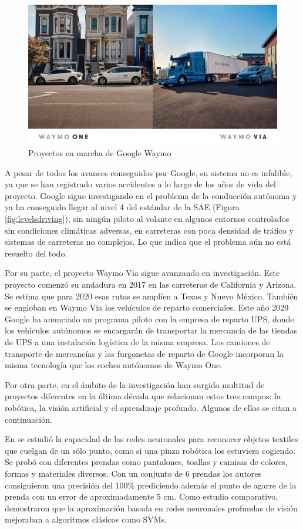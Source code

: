 \begin{figure}
  \centering
  \includegraphics[width=.9\linewidth]{img/waymo_one_via.jpg}
  \caption{Proyectos en marcha de Google Waymo}
  \label{fig:waymo}
\end{figure}

A pesar de todos los avances conseguidos por Google, su sistema no es infalible, ya que se han registrado varios accidentes a lo largo de los años de vida del proyecto. Google sigue investigando en el problema de la conducción autónoma y ya ha conseguido llegar al nivel 4 del estándar de la SAE (Figura \ref{fig:levelsdriving}), sin ningún piloto al volante en algunos entornos controlados sin condiciones climáticas adversas, en carreteras con poca densidad de tráfico y sistemas de carreteras no complejos. Lo que indica que el problema aún no está resuelto del todo.

Por su parte, el proyecto Waymo Via sigue avanzando en investigación. Este proyecto comenzó su andadura en 2017 en las carreteras de California y Arizona.  Se estima que para 2020 esas rutas se amplíen a Texas y Nuevo México. También se engloban en Waymo Via los vehículos de reparto comerciales. Este año 2020 Google ha anunciado un programa piloto con la empresa de reparto UPS, donde los vehículos autónomos se encargarán de transportar la mercancía de las tiendas de UPS a una instalación logística de la misma empresa. Los camiones de transporte de mercancías y las furgonetas de reparto de Google incorporan la misma tecnología que los coches autónomos de Waymo One.

Por otra parte, en el ámbito de la investigación han surgido multitud de proyectos diferentes en la última década que relacionan estos tres campos: la robótica, la visión artificial y el aprendizaje profundo. Algunos de ellos se citan a continuación.

En \cite{deformable} se estudió la capacidad de las redes neuronales para reconocer objetos textiles que cuelgan de un sólo punto, como si una pinza robótica los estuviera cogiendo. Se probó con diferentes prendas como pantalones, toallas y camisas de colores, formas y materiales diversos. Con un conjunto de 6 prendas los autores consiguieron una precisión del 100\% prediciendo además el punto de agarre de la prenda con un error de aproximadamente 5 cm. Como estudio comparativo, demostraron que la aproximación basada en redes neuronales profundas de visión mejoraban a algoritmos clásicos como SVMs.

